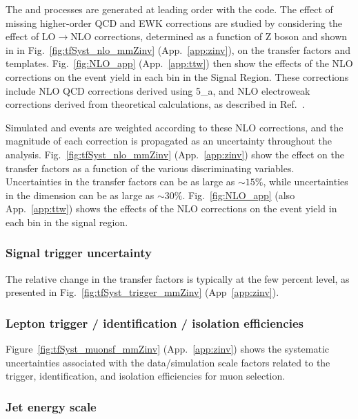 The \zmmj and \znunuj processes are generated at leading order with
the \MADGRAPH code. The effect of missing higher-order QCD and EWK
corrections are studied by considering the effect of
LO$\rightarrow$NLO corrections, determined as a function of Z boson
\Pt and shown in in Fig.~\ref{fig:tfSyst_nlo_mmZinv}
(App.~\ref{app:zinv}), on the transfer factors and \HTmiss templates.
Fig.~\ref{fig:NLO_app} (App.~\ref{app:ttw}) then show the effects of the NLO
corrections on the event yield in each bin in the Signal Region.
These corrections include
NLO QCD corrections derived using {\MADGRAPH{}5\_a\MCATNLO},
and NLO electroweak corrections derived from theoretical calculations,
as described in Ref.~\cite{monojet_AN_36fb}.

Simulated \zmmj and \znunuj events are weighted according to these NLO
corrections, and the magnitude of each correction is propagated as an
uncertainty throughout the analysis. Fig.~\ref{fig:tfSyst_nlo_mmZinv}
(App.~\ref{app:zinv}) show the effect on the transfer factors as a
function of the various discriminating variables. Uncertainties in the
transfer factors can be as large as ${\sim}15\%$, while uncertainties
in the \mht dimension can be as large as
${\sim}30\%$. Fig.~\ref{fig:NLO_app} (also App.~\ref{app:ttw}) shows
the effects of the NLO corrections on the event yield in each bin in
the signal region.

\subsubsection{Signal trigger uncertainty}
\label{sec:tfSyst_trigger-zinv}

The relative change in the transfer factors is typically at the few
percent level, as presented in Fig.~\ref{fig:tfSyst_trigger_mmZinv}
(App~\ref{app:zinv}).

\subsubsection{Lepton trigger / identification / isolation efficiencies}
\label{sec:leptonSyst-zinv}

Figure~\ref{fig:tfSyst_muonsf_mmZinv} (App.~\ref{app:zinv}) shows the
systematic uncertainties associated with the data/simulation scale
factors related to the trigger, identification, and isolation
efficiencies for muon selection.

\subsubsection{Jet energy scale}
\label{sec:tfSyst_jec-zinv}

